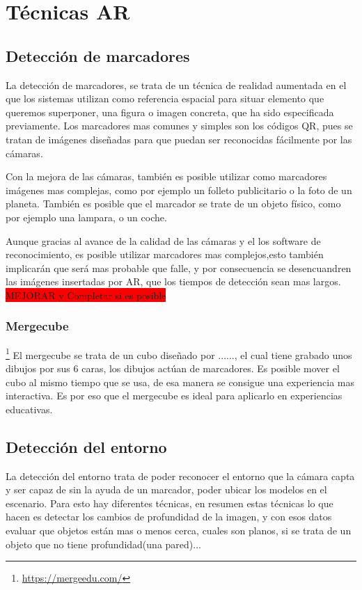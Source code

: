 \section{Técnicas AR}
	\subsection{Detección de marcadores}
	La detección de marcadores, se trata de un técnica de realidad aumentada en el que los sistemas utilizan como referencia espacial para situar elemento que queremos superponer, una figura o imagen concreta, que ha sido especificada previamente. Los marcadores mas comunes y simples son los códigos QR, pues se tratan de imágenes diseñadas para que puedan ser reconocidas fácilmente por las cámaras.
	
	Con la mejora de las cámaras, también es posible utilizar como marcadores imágenes mas complejas, como por ejemplo un folleto publicitario o la foto de un planeta.
	También es posible que el marcador se trate de un objeto físico, como por ejemplo una lampara, o un coche.
	
	Aunque gracias al avance de la calidad de las cámaras y el los software de reconocimiento, es posible utilizar marcadores mas complejos,esto también implicarán que será mas probable que falle, y por consecuencia se desencuandren las imágenes insertadas por AR, que los tiempos de detección sean mas largos.
	\colorbox{red}{MEJORAR y Completar si es posible}
	
	\subsubsection{Mergecube}\footnote{\url{https://mergeedu.com/}}
	El mergecube se trata de un cubo diseñado por ......, el cual tiene grabado unos dibujos por sus 6 caras, los dibujos actúan de marcadores. Es posible mover el cubo al mismo tiempo que se usa, de esa manera se consigue una experiencia mas interactiva. Es por eso que el mergecube es ideal para aplicarlo en experiencias educativas. 
	\subsection{Detección del entorno}
	La detección del entorno trata de poder reconocer el entorno que la cámara capta y ser capaz de sin la ayuda de un marcador, poder ubicar los modelos en el escenario.
	Para esto hay diferentes técnicas, en resumen estas técnicas lo que hacen es detectar los cambios de profundidad de la imagen, y con esos datos evaluar que objetos están mas o menos cerca, cuales son planos, si se trata de un objeto que no tiene profundidad(una pared)...
